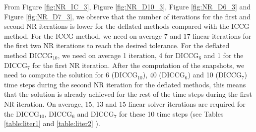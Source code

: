 \documentclass[12pt]{article}
\numberwithin{equation}{section}
\begin{document}
From Figure \ref{fig:NR_IC_3}, Figure \ref{fig:NR_D10_3}, Figure \ref{fig:NR_D6_3} and Figure \ref{fig:NR_D7_3}, we observe that the number of iterations for the first and second NR iterations is lower for the deflated methods compared with the ICCG method. For the ICCG method, we need on average 7 and 17 linear iterations for the first two NR iterations to reach the desired tolerance. For the deflated method DICCG$_{10}$, we need on average 1 iteration, 4 for DICCG$_6$ and 1 for the DICCG$_7$ for the first NR iteration. After the computation of the snapshots, we need to compute the solution for 6 (DICCG$_{10}$), 40 (DICCG$_{6}$) and 10 (DICCG$_{7}$) time steps during the second NR iteration for the deflated methods, this means that the solution is already achieved for the rest of the time steps during the first NR iteration. On average, 15, 13 and 15 linear solver iterations are required for the DICCG$_{10}$, DICCG$_6$ and DICCG$_7$ for these 10 time steps (see Tables \ref{table:liter1} and \ref{table:liter2} ). \\
\end{document}
